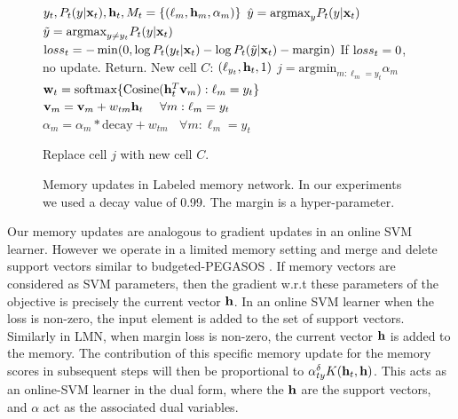 \documentclass[letterpaper]{article} %
\newcommand{\vek}[1]{{\bf {#1}}}
\newcommand{\vx}{{\vek{x}}}
\newcommand{\vw}{{\vek{w}}}
\newcommand{\vh}{{\vek{h}}}
\newcommand{\vM}{{\vek{v}}}
\newcommand{\argmax}{{\text{argmax}}}
\newcommand{\argmin}{{\text{argmin}}}
\newcommand{\loss}{{\text loss}}
\def\shiv#1{\todo [color=orange]{Shiv: #1}}
\def\sunita#1{\todo [color=purple]{Sunita: #1}}
\begin{document}
\begin{figure}
\begin{center}
\begin{algorithmic}
   $y_t, P_t(y|\vx_t), \vh_t, M_t = \{(\ell_m, \vh_m, \alpha_m)\}$
  \STATE $\hat{y} = \argmax_y P_t(y|\vx_t)$
  \STATE $\tilde{y} = \argmax_{y \neq y_t} P_t(y|\vx_t)$
  \STATE $\loss_t = - \min(0, \log P_t(y_t|\vx_t) - \log P_t(\tilde{y}|\vx_t) - \text{margin} )$
  \STATE If $\loss_t=0$, no update. Return.
  \STATE New cell $C$: $(\ell_{y_t}, \vh_t, 1)$
  \STATE $j = \argmin_{m:\ell_m = y_t} \alpha_m$
  \STATE $\vw_t = \text{softmax}\{\text{Cosine}(\vh_t^T \vM_m) :\ell_m = y_t\}$
  \STATE $\vM_{m} = \vM_{m} + w_{tm}{\vh_t}~~~~\forall m: \ell_m = y_t$
  \STATE $\alpha_{m} = \alpha_m*\text{decay} + w_{tm}~~~~\forall m: \ell_m = y_t$

  \STATE Replace cell $j$ with new cell $C$.
  \ENDIF
\end{algorithmic}
\caption{\label{alg-write}Memory updates in Labeled memory network. In our experiments we used a decay value of 0.99.   The margin is a hyper-parameter.}
\end{center}
\end{figure}

Our memory updates are analogous to gradient updates in an online SVM learner. However we operate in a limited memory setting and merge and delete support vectors similar to budgeted-PEGASOS \cite{WangCV10}. If memory vectors are considered as SVM parameters, then the gradient w.r.t these parameters of the objective is precisely the current vector $\bf{h}$. In an online SVM learner when the loss is non-zero, the input element is added to the set of support vectors. Similarly in LMN, when margin loss is non-zero, the current vector $\bf{h}$ is added to the memory. The contribution of this specific memory update for the memory scores in subsequent steps will then be proportional to $\alpha_{ty}^\delta K(\vh_t, \bf{h})$. This acts as an online-SVM learner in the dual form, where the $\bf{h}$ are the support vectors, and $\alpha$ act as the associated dual variables.
\end{document}
